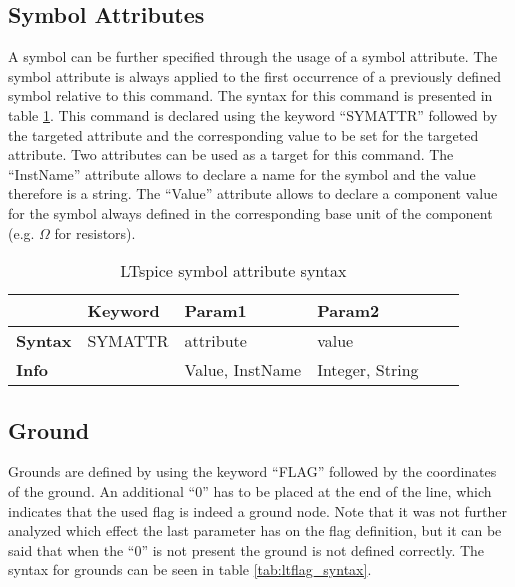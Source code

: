 \subsection{Symbol Attributes}

A symbol can be further specified through the usage of a symbol attribute.
The symbol attribute is always applied to the first occurrence of a previously defined symbol relative to this command.
The syntax for this command is presented in table \ref{tab:ltsymattr_syntax}.
This command is declared using the keyword ``SYMATTR'' followed by the targeted attribute and the corresponding value to be set for the targeted attribute.
Two attributes can be used as a target for this command.
The ``InstName'' attribute allows to declare a name for the symbol and the value therefore is a string.
The ``Value'' attribute allows to declare a component value for the symbol always defined in the corresponding base unit of the component (e.g. $\Omega$ for resistors).

\begin{table}[H]
\begin{center}

\begin{tabular}{l|l|l|l|l|l}
    & \textbf{Keyword} & \textbf{Param1} & \textbf{Param2}\\
    \hline
    \textbf{Syntax} & SYMATTR & attribute & value\\
    \textbf{Info} & & Value, InstName & Integer, String\\
\end{tabular}
\caption{LTspice symbol attribute syntax}
\label{tab:ltsymattr_syntax}

\end{center}
\end{table}

\subsection{Ground}

Grounds are defined by using the keyword ``FLAG'' followed by the coordinates of the ground.
An additional ``0'' has to be placed at the end of the line, which indicates that the used flag is indeed a ground node.
Note that it was not further analyzed which effect the last parameter has on the flag definition, but it can be said that when the ``0'' is not present the ground is not defined correctly.
The syntax for grounds can be seen in table \ref{tab:ltflag_syntax}.

